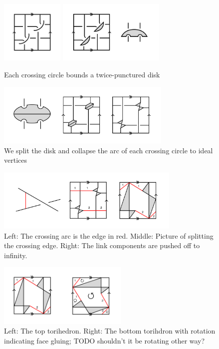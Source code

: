 \documentclass[11pt]{amsart}
\theoremstyle{plain}
\theoremstyle{definition}
\begin{document}
\begin{figure}[h] 
\centering
\includegraphics[height=3cm]{fig-3.png}
\includegraphics[height=3cm]{fig-4.png}
	\caption{Each crossing circle bounds a twice-punctured disk}
	\label{fig:step_one}
\end{figure}
 
\begin{figure}[h] 
\centering 
\includegraphics[height=3cm]{fig-5.png} 
	\caption{We split the disk and collapse the arc of each
 crossing circle to ideal vertices}
	\label{fig:step_two}
\end{figure}


\begin{figure}[h] 
\centering 
\includegraphics[height=3cm]{fig-6.png} 
\caption{Left: The crossing arc is the edge in red.
Middle: Picture of splitting the crossing edge.
Right: The link components are pushed off to infinity.}
	\label{fig:step_three}
\end{figure}

\begin{figure}[h] 
\centering 
\includegraphics[height=3cm]{top-bottom.png} 
	\caption{Left: The top torihedron.
	Right: The bottom torihdron with rotation indicating face gluing;
	TODO shouldn't it be rotating other way?} 
\label{fig:top-bottom}
\end{figure}
\end{document}
